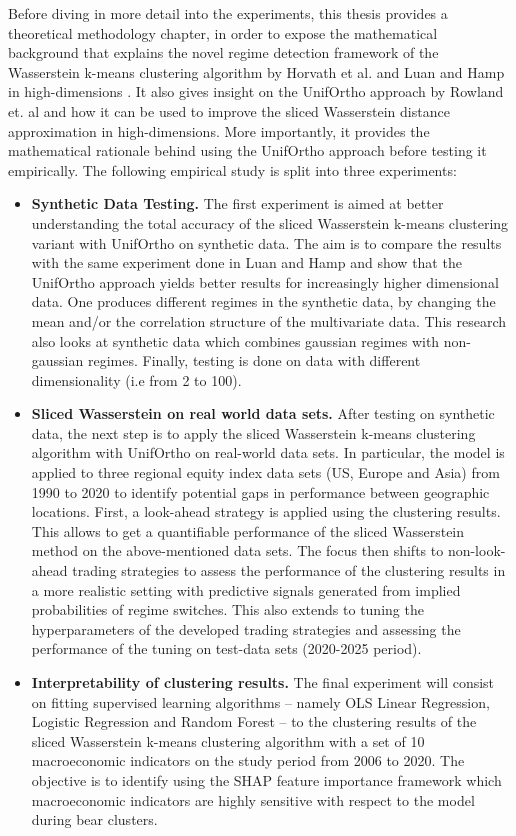 \documentclass[12pt,a4paper]{report}
\begin{document}
Before diving in more detail into the experiments, this thesis provides a theoretical methodology chapter, in order to expose the 
mathematical background that explains the novel regime detection framework of the Wasserstein k-means clustering algorithm by Horvath et al. \cite{HorvathEtAl2024} and Luan and Hamp in high-dimensions \cite{LuanHamp2025}.
It also gives insight on the UnifOrtho approach by Rowland et. al \cite{RowlandEtAl2019} and how it can be used to improve the sliced Wasserstein distance approximation in high-dimensions.
More importantly, it provides the mathematical rationale behind using the UnifOrtho approach before testing it empirically.
The following empirical study is split into three experiments: 


\begin{itemize}
  \item \textbf{Synthetic Data Testing.} The first experiment
  is aimed at better understanding the total accuracy of the sliced Wasserstein k-means clustering variant with UnifOrtho on synthetic data. 
  The aim is to compare the results with the same experiment done in Luan and Hamp \cite{LuanHamp2025} and show that the UnifOrtho approach yields better results for increasingly higher dimensional data.
  One produces different regimes in the synthetic data, by changing the mean and/or the correlation structure of the multivariate data.
  This research also looks at synthetic data which combines gaussian regimes with non-gaussian regimes. 
  Finally, testing is done on data with different dimensionality (i.e from 2 to 100).

  \item \textbf{Sliced Wasserstein on real world data sets.}
  After testing on synthetic data, the next step is to apply the sliced Wasserstein k-means clustering algorithm with UnifOrtho on real-world data sets.
  In particular, the model is applied to three regional equity index data sets (US, Europe and Asia) from 1990 to 2020 to identify potential gaps in performance between geographic locations.
  First, a look-ahead strategy is applied using the clustering results. This allows to get a quantifiable performance of the sliced Wasserstein method on the above-mentioned data sets.
  The focus then shifts to non-look-ahead trading strategies to assess the performance of the clustering results in a more realistic setting with predictive signals generated from implied probabilities of regime switches.
  This also extends to tuning the hyperparameters of the developed trading strategies and assessing the performance of the tuning on test-data sets (2020-2025 period).

  \item \textbf{Interpretability of clustering results.}
  The final experiment will consist on fitting supervised learning algorithms -- namely OLS Linear Regression, Logistic Regression and Random Forest -- to the clustering results of the sliced Wasserstein k-means clustering algorithm with a set of 10 macroeconomic indicators on the study period from 2006 to 2020.
  The objective is to identify using the SHAP feature importance framework which macroeconomic indicators are highly sensitive with respect to the model during bear clusters.  
\end{itemize}
\end{document}
